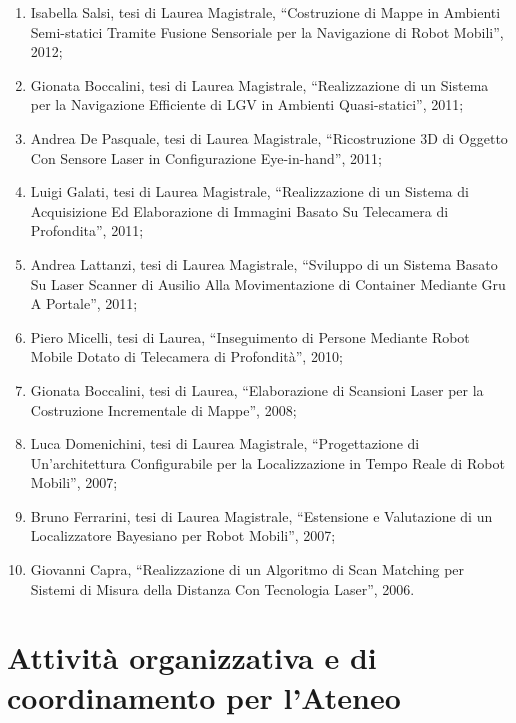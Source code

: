 \documentclass[11pt]{article}
\begin{document}
\begin{enumerate}
\item Isabella Salsi, tesi di Laurea Magistrale, ``Costruzione di Mappe in Ambienti Semi-statici Tramite Fusione Sensoriale per la Navigazione di Robot Mobili'', 2012;
%
\item Gionata Boccalini, tesi di Laurea Magistrale, ``Realizzazione di un Sistema per la Navigazione Efficiente di LGV in Ambienti Quasi-statici'', 2011;
\item Andrea De Pasquale, tesi di Laurea Magistrale, ``Ricostruzione 3D di Oggetto Con Sensore Laser in Configurazione Eye-in-hand'', 2011;
\item Luigi Galati, tesi di Laurea Magistrale, ``Realizzazione di un Sistema di Acquisizione Ed Elaborazione di Immagini Basato Su Telecamera di Profondita'', 2011;
\item Andrea Lattanzi, tesi di Laurea Magistrale, ``Sviluppo di un Sistema Basato Su Laser Scanner di Ausilio Alla Movimentazione di Container Mediante Gru A Portale'', 2011; 
%
\item Piero Micelli, tesi di Laurea, ``Inseguimento di Persone Mediante Robot Mobile Dotato di Telecamera di Profondit\`a'', 2010;
%
\item Gionata Boccalini, tesi di Laurea, ``Elaborazione di Scansioni Laser per la Costruzione Incrementale di Mappe'', 2008;
%
\item Luca Domenichini, tesi di Laurea Magistrale, ``Progettazione di Un’architettura Configurabile per la Localizzazione in Tempo Reale di Robot Mobili'', 2007;
\item Bruno Ferrarini, tesi di Laurea Magistrale, ``Estensione e Valutazione di un Localizzatore Bayesiano per Robot Mobili'', 2007;
%
\item Giovanni Capra, ``Realizzazione di un Algoritmo di Scan Matching per Sistemi di Misura della  Distanza Con Tecnologia Laser'', 2006. 
\end{enumerate}


\section{Attivit\`a organizzativa e di coordinamento per l'Ateneo}
\end{document}
